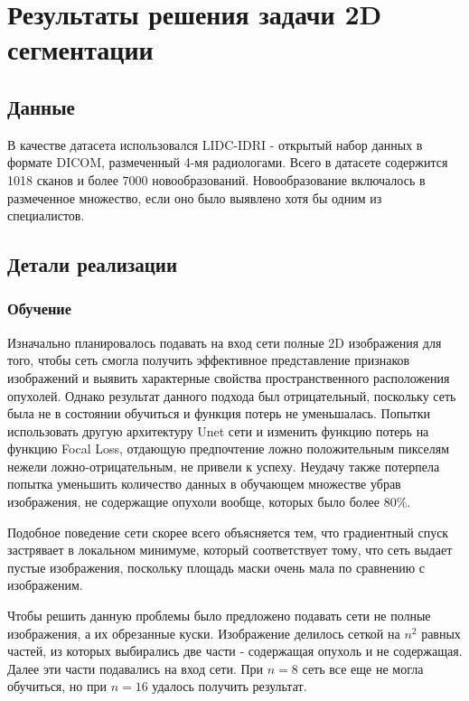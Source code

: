 \chapter{Результаты решения задачи 2D сегментации}

\section{Данные}

В качестве датасета использовался LIDC-IDRI \cite{lidc} - открытый набор данных в формате DICOM, размеченный 4-мя радиологами. Всего в датасете содержится 1018 сканов и более 7000 новообразований. Новообразование включалось в размеченное множество, если оно было выявлено хотя бы одним из специалистов.


\section{Детали реализации}

\subsection{Обучение}

Изначально планировалось подавать на вход сети полные 2D изображения для того, чтобы сеть смогла получить эффективное представление признаков изображений и выявить характерные свойства пространственного расположения опухолей. Однако результат данного подхода был отрицательный, поскольку сеть была не в состоянии обучиться и функция потерь не уменьшалась. Попытки использовать другую архитектуру Unet сети и изменить функцию потерь на функцию Focal Loss, отдающую предпочтение ложно положительным пикселям нежели ложно-отрицательным, не привели к успеху. Неудачу также потерпела попытка уменьшить количество данных в обучающем множестве убрав изображения, не содержащие опухоли вообще, которых было более 80\%.

Подобное поведение сети скорее всего объясняется тем, что градиентный спуск застрявает в локальном минимуме, который соответствует тому, что сеть выдает пустые изображения, поскольку площадь маски очень мала по сравнению с изображеним.

Чтобы решить данную проблемы было предложено подавать сети не полные изображения, а их обрезанные куски. Изображение делилось сеткой на $n^2$ равных частей, из которых выбирались две части - содержащая опухоль и не содержащая. Далее эти части подавались на вход сети. При $n = 8$ сеть все еще не могла обучиться, но при $n = 16$ удалось получить результат.

